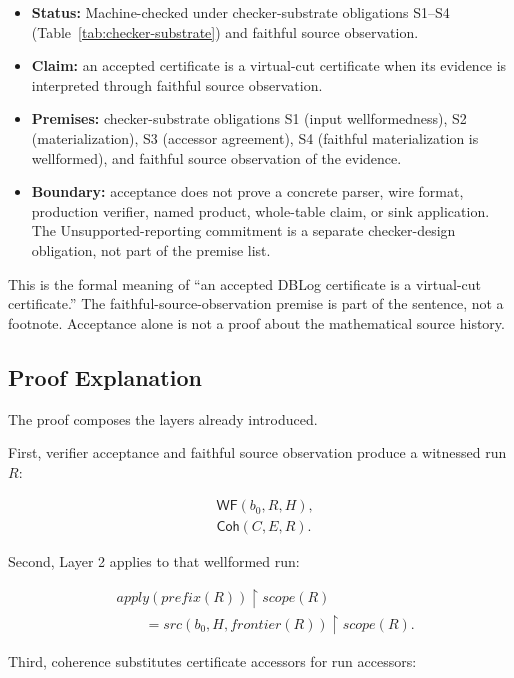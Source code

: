 \documentclass[letterpaper,10pt,twocolumn]{article}
\newcommand{\restrict}{\mathbin{\upharpoonright}}
\newcommand{\Apply}{\mathit{apply}}
\newcommand{\Src}{\mathit{src}}
\newcommand{\Scope}{\mathit{scope}}
\newcommand{\Frontier}{\mathit{frontier}}
\newcommand{\CleanPrefix}{\mathit{prefix}}
\newcommand{\WF}{\mathsf{WF}}
\newcommand{\Coh}{\mathsf{Coh}}
\providecommand{\tightlist}{\setlength{\itemsep}{0pt}\setlength{\parskip}{0pt}}
\begin{document}
\begin{itemize}
\tightlist
\item
  \textbf{Status:} Machine-checked under
  checker-substrate obligations S1--S4 (Table~\ref{tab:checker-substrate})
  and faithful source observation.
\item
  \textbf{Claim:} an accepted certificate is a virtual-cut certificate
  when its evidence is interpreted through faithful source observation.
\item
  \textbf{Premises:} checker-substrate obligations S1 (input
  wellformedness), S2 (materialization), S3 (accessor agreement),
  S4 (faithful materialization is wellformed), and faithful source
  observation of the evidence.
\item
  \textbf{Boundary:} acceptance does not prove a concrete parser, wire
  format, production verifier, named product, whole-table claim, or sink
  application. The Unsupported-reporting commitment is a separate
  checker-design obligation, not part of the premise list.
\end{itemize}

This is the formal meaning of ``an accepted DBLog certificate is a
virtual-cut certificate.'' The faithful-source-observation premise is
part of the sentence, not a footnote. Acceptance alone is not a proof
about the mathematical source history.

\subsection{Proof Explanation}\label{proof-explanation}

The proof composes the layers already introduced.

First, verifier acceptance and faithful source observation produce a
witnessed run $R$:

\[
\begin{aligned}
&\WF(b_0,R,H),\\
&\Coh(C,E,R).
\end{aligned}
\]

Second, Layer 2 applies to that wellformed run:

\[
\begin{aligned}
&\Apply(\CleanPrefix(R)) \restrict \Scope(R)\\
&\qquad= \Src(b_0,H,\Frontier(R)) \restrict \Scope(R).
\end{aligned}
\]

Third, coherence substitutes certificate accessors for run accessors:
\end{document}
